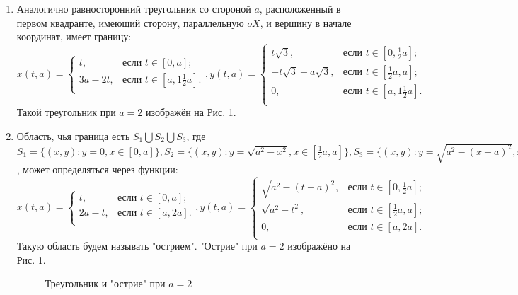\documentclass[a4paper, 12pt]{article}
\begin{document}
\begin{enumerate}
    \item Аналогично равносторонний треугольник со стороной $a$, расположенный в первом квадранте, имеющий сторону, параллельную $oX$, и вершину в начале координат, имеет границу:
    \[
        x(t,a) =
        \begin{cases}
        t, & \text{если $t \in [0,a]$;} \\
        3a-2t, & \text{если $t \in [a,1\frac{1}{2}a]$.} \\
        \end{cases},
        y(t,a) =
        \begin{cases}
        t \sqrt{3}, & \text{если $t \in [0,\frac{1}{2}a]$;} \\
        -t \sqrt{3}+a\sqrt{3}, & \text{если $t \in [\frac{1}{2}a,a]$;} \\
        0, & \text{если $t \in [a,1\frac{1}{2}a]$.} \\
        \end{cases}
        \]
        Такой треугольник при $a=2$ изображён на Рис. \ref{tros}.

    \item Область, чья граница есть $S_1 \bigcup S_2 \bigcup S_3$, где $S_1=\{(x,y): y=0, x \in [0, a]\},S_2=\{(x,y): y=\sqrt{a^2-x^2}, x \in [\frac{1}{2}a, a]\},S_3=\{(x,y): y=\sqrt{a^2-(x-a)^2}, x \in [0,\frac{1}{2} a]\}$, может определяться через функции:       
    \[
        x(t,a) =
        \begin{cases}
        t, & \text{если $t \in [0,a]$;} \\
        2a-t, & \text{если $t \in [a,2a]$.} \\
        \end{cases},
        y(t,a) =
        \begin{cases}
        \sqrt{a^2-(t-a)^2}, & \text{если $t \in [0,\frac{1}{2}a]$;} \\
        \sqrt{a^2-t^2}, & \text{если $t \in [\frac{1}{2}a,a]$;} \\
        0, & \text{если $t \in [a,2a]$.} \\
        \end{cases}
        \]
        Такую область будем называть "острием". "Острие" при $a=2$ изображёно на Рис. \ref{tros}.
        
        \begin{figure}[h!]
          \noindent{}
          \caption{Треугольник и "острие" при $a=2$}
          \label{tros}
          \end{figure}  
\end{enumerate}
\end{document}
